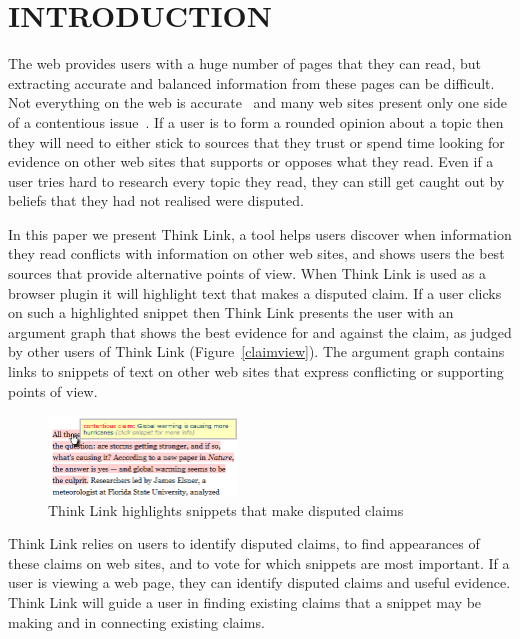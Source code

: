 \documentclass{chi2009}
\begin{document}
\section{INTRODUCTION}

The web provides users with a huge number of pages that they can read, but extracting accurate and balanced information from these pages can be difficult. Not everything on the web is accurate~\cite{Mintz2002,Neumann2003,Resnik1998,Zhou2004} and many web sites present only one side of a contentious issue~\cite{Herman2002,Gentzkow2007}. If a user is to form a rounded opinion about a topic then they will need to either stick to sources that they trust or spend time looking for evidence on other web sites that supports or opposes what they read. Even if a user tries hard to research every topic they read, they can still get caught out by beliefs that they had not realised were disputed.


In this paper we present Think Link, a tool helps users discover when information they read conflicts with information on other web sites, and shows users the best sources that provide alternative points of view. When Think Link is used as a browser plugin it will highlight text that makes a disputed claim. If a user clicks on such a highlighted snippet then Think Link presents the user with an argument graph that shows the best evidence for and against the claim, as judged by other users of Think Link (Figure~\ref{claimview}). The argument graph contains links to snippets of text on other web sites that express conflicting or supporting points of view.

\begin{figure}[tb]
	\begin{center}
	\includegraphics[width=5cm]{../screenshots/highlight_crop.png}
	\caption{Think Link highlights snippets that make disputed claims}
	\label{highlight}
	\end{center}
\end{figure}


Think Link relies on users to identify disputed claims, to find appearances of these claims on web sites, and to vote for which snippets are most important. If a user is viewing a web page, they can identify disputed claims and useful evidence. Think Link will guide a user in finding existing claims that a snippet may be making and in connecting existing claims.
\end{document}
